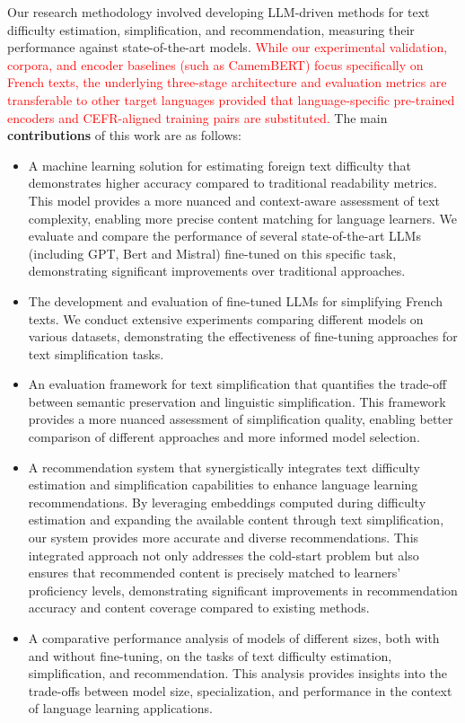 Our research methodology involved developing LLM-driven methods for text difficulty estimation, simplification, and recommendation, measuring their performance against state-of-the-art models. \textcolor{red}{While our experimental validation, corpora, and encoder baselines (such as CamemBERT) focus specifically on French texts, the underlying three-stage architecture and evaluation metrics are transferable to other target languages provided that language-specific pre-trained encoders and CEFR-aligned training pairs are substituted.}
The main \textbf{contributions} of this work are as follows:

\begin{itemize}
    \item A machine learning solution for estimating foreign text difficulty that demonstrates higher accuracy compared to traditional readability metrics. This model provides a more nuanced and context-aware assessment of text complexity, enabling more precise content matching for language learners. We evaluate and compare the performance of several state-of-the-art LLMs (including GPT, Bert and Mistral) fine-tuned on this specific task, demonstrating significant improvements over traditional approaches.

    \item The development and evaluation of fine-tuned LLMs for simplifying French texts. We conduct extensive experiments comparing different models on various datasets, demonstrating the effectiveness of fine-tuning approaches for text simplification tasks.

    \item An evaluation framework for text simplification that quantifies the trade-off between semantic preservation and linguistic simplification. This framework provides a more nuanced assessment of simplification quality, enabling better comparison of different approaches and more informed model selection.

    \item A recommendation system that synergistically integrates text difficulty estimation and simplification capabilities to enhance language learning recommendations. By leveraging embeddings computed during difficulty estimation and expanding the available content through text simplification, our system provides more accurate and diverse recommendations. This integrated approach not only addresses the cold-start problem but also ensures that recommended content is precisely matched to learners' proficiency levels, demonstrating significant improvements in recommendation accuracy and content coverage compared to existing methods.

    \item A comparative performance analysis of models of different sizes, both with and without fine-tuning, on the tasks of text difficulty estimation, simplification, and recommendation. This analysis provides insights into the trade-offs between model size, specialization, and performance in the context of language learning applications.
\end{itemize}

